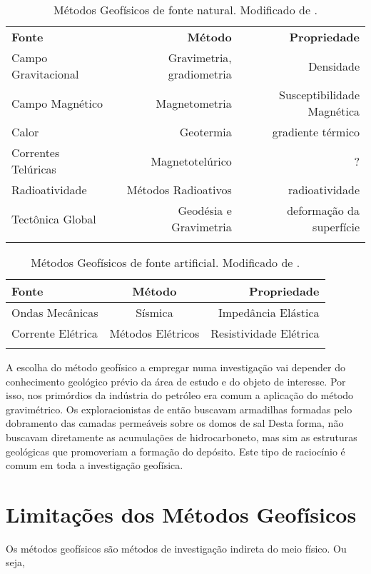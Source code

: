 \documentclass[0000]{subfiles}
\begin{document}
\begin{table}\centering
	\caption{M\'{e}todos Geof\'{i}sicos de fonte natural. Modificado de \cite{kearey_pt,telford_applied_1990}.}
	\begin{tabular}{lrr}
	\toprule
	\bfseries{Fonte}&\bfseries{M\'{e}todo}&\bfseries{Propriedade}\\
	Campo Gravitacional&Gravimetria, gradiometria&Densidade\\
	Campo Magn\'{e}tico&Magnetometria&Susceptibilidade Magn\'{e}tica\\
	Calor & Geotermia & gradiente t\'{e}rmico\\
	Correntes Tel\'{u}ricas& Magnetotel\'{u}rico&?\\
	Radioatividade&M\'{e}todos Radioativos&radioatividade\\
	Tect\^{o}nica Global&Geod\'{e}sia e Gravimetria&deforma\c{c}\~{a}o da superf\'{i}cie\\
	\bottomrule
	\label{tab:fontesnat}
	\end{tabular}
\end{table}


\begin{table}\centering
	\caption{M\'{e}todos Geof\'{i}sicos de fonte artificial. Modificado de \cite{kearey_pt,telford_applied_1990}.}
	\begin{tabular}{lcr}
	\bfseries{Fonte}&\bfseries{M\'{e}todo}&\bfseries{Propriedade}\\
\toprule
	Ondas Mec\^{a}nicas&S\'{i}smica&Imped\^{a}ncia El\'{a}stica\\
	Corrente El\'{e}trica& M\'{e}todos El\'{e}tricos&Resistividade El\'{e}trica\\
	\bottomrule
	\label{tab:fontesart}
	\end{tabular}
\end{table}

A escolha do m\'{e}todo geof\'{i}sico a empregar numa investiga\c{c}\~{a}o vai depender do conhecimento geol\'{o}gico pr\'{e}vio da \'{a}rea de estudo e do objeto de interesse.
Por isso, nos prim\'{o}rdios da ind\'{u}stria do petr\'{o}leo era comum a aplica\c{c}\~{a}o do m\'{e}todo gravim\'{e}trico.
Os exploracionistas de ent\~{a}o buscavam armadilhas formadas pelo dobramento das camadas perme\'{a}veis sobre os domos de sal
Desta forma, n\~{a}o buscavam diretamente as acumula\c{c}\~{o}es de hidrocarboneto, mas sim as estruturas geol\'{o}gicas que promoveriam a forma\c{c}\~{a}o do dep\'{o}sito.
Este tipo de racioc\'{i}nio \'{e} comum em toda a investiga\c{c}\~{a}o geof\'{i}sica.

\section{Limita\c{c}\~oes dos M\'etodos Geof\'isicos}

Os m\'etodos geof\'isicos s\~ao m\'etodos de investiga\c{c}\~ao indireta do meio f\'isico. 
Ou seja,
\end{document}
